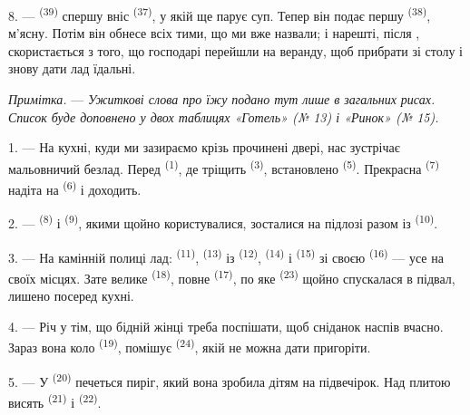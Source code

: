 8. ---  \textsuperscript{(39)} спершу вніс 
\textsuperscript{(37)}, у якій ще парує суп. Тепер він подає першу
 \textsuperscript{(38)}, м'ясну. Потім він обнесе всіх тими, що ми
вже назвали; і нарешті, після , скористається з того, що
господарі перейшли на веранду, щоб прибрати зі столу і знову дати лад їдальні.

\textit{Примітка.} --- \textit{Ужиткові слова про їжу подано тут лише в
загальних рисах. Список буде доповнено у двох таблицях «Готель» (№ 13) і
«Ринок» (№ 15).}

\VUsaut{4.6mm}
\VUsaut{3.0mm}

1. --- На кухні, куди ми зазираємо крізь прочинені двері, нас зустрічає
мальовничий безлад. Перед  \textsuperscript{(1)}, де тріщить
 \textsuperscript{(3)}, встановлено 
\textsuperscript{(5)}. Прекрасна  \textsuperscript{(7)} надіта на
 \textsuperscript{(6)} і доходить.

2. ---  \textsuperscript{(8)} і 
\textsuperscript{(9)}, якими щойно користувалися, зосталися на підлозі разом із
 \textsuperscript{(10)}.

3. --- На камінній полиці лад:  \textsuperscript{(11)},
 \textsuperscript{(13)} із 
\textsuperscript{(12)},  \textsuperscript{(14)} і  \textsuperscript{(15)} зі своєю  \textsuperscript{(16)}
--- усе на своїх місцях. Зате велике 
\textsuperscript{(18)}, повне  \textsuperscript{(17)}, по яке
 \textsuperscript{(23)} щойно спускалася в підвал, лишено
посеред кухні.

4. --- Річ у тім, що бідній жінці треба поспішати, щоб сніданок наспів вчасно.
Зараз вона коло  \textsuperscript{(19)}, помішує 
\textsuperscript{(24)}, якій не можна дати пригоріти.

5. --- У  \textsuperscript{(20)} печеться пиріг, який вона
зробила дітям на підвечірок. Над плитою висять 
\textsuperscript{(21)} і  \textsuperscript{(22)}.

\VUsaut{4.0mm}
\VUsaut{3.0mm}


